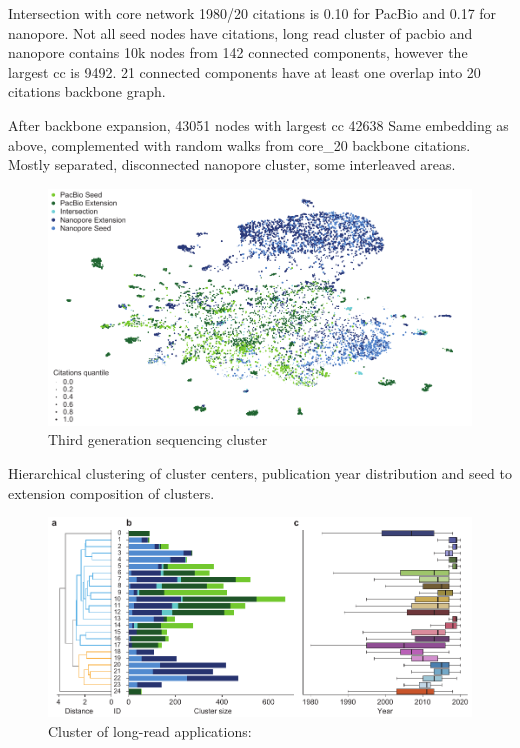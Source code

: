 Intersection with core network 1980/20 citations is 0.10 for PacBio and 0.17 for nanopore.
Not all seed nodes have citations, long read cluster of pacbio and nanopore contains 10k nodes from 142 connected components, however the largest cc is 9492.
21 connected components have at least one overlap into 20 citations backbone graph.

After backbone expansion, 43051 nodes with largest cc 42638
Same embedding as above, complemented with random walks from core\_20 backbone citations. Mostly separated, disconnected nanopore cluster, some interleaved areas.

\begin{figure}[h]
	\centering
	\includegraphics[width=1.0\textwidth]{figures/state_of_art/umap_lr.pdf}
	\captionsetup{format=plain}
	\caption[Third generation sequencing cluster]{Third generation sequencing cluster}
	\label{fig:state_of_art:umap_lr}
\end{figure}

Hierarchical clustering of cluster centers, publication year distribution and seed to extension composition of clusters.

\begin{figure}[h]
	\centering
	\includegraphics[width=1.0\textwidth]{figures/state_of_art/cluster_sizes.pdf}
	\captionsetup{format=plain}
	\caption[Long-Read Application Cluster]{Cluster of long-read applications:}
	\label{fig:state_of_art:cluster_sizes}
\end{figure}


